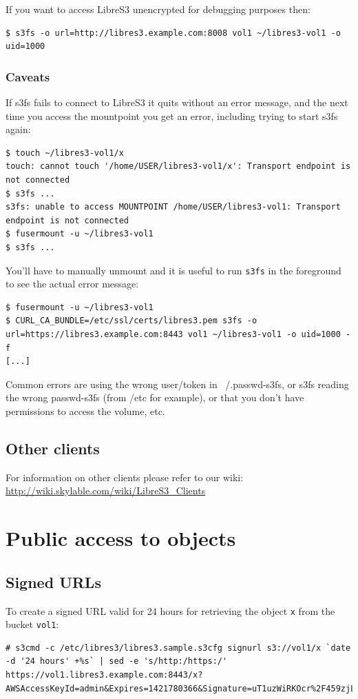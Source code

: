 If you want to access LibreS3 unencrypted for debugging purposes then:
\begin{lstlisting}
$ s3fs -o url=http://libres3.example.com:8008 vol1 ~/libres3-vol1 -o uid=1000
\end{lstlisting}

\subsection*{Caveats}

If s3fs fails to connect to LibreS3 it quits without an error message,
and the next time you access the mountpoint you get an error,
including trying to start s3fs again:
\begin{lstlisting}
$ touch ~/libres3-vol1/x
touch: cannot touch '/home/USER/libres3-vol1/x': Transport endpoint is not connected
$ s3fs ...
s3fs: unable to access MOUNTPOINT /home/USER/libres3-vol1: Transport endpoint is not connected
$ fusermount -u ~/libres3-vol1
$ s3fs ...
\end{lstlisting}

You'll have to manually unmount and it is useful to run \verb|s3fs| in the
foreground to see the actual error message:
\begin{lstlisting}
$ fusermount -u ~/libres3-vol1
$ CURL_CA_BUNDLE=/etc/ssl/certs/libres3.pem s3fs -o url=https://libres3.example.com:8443 vol1 ~/libres3-vol1 -o uid=1000 -f
[...]
\end{lstlisting}

Common errors are using the wrong user/token in ~/.passwd-s3fs, or
s3fs reading the wrong passwd-s3fs (from /etc for example), or that you don't have permissions to access the volume, etc.

\section*{Other clients}
For information on other clients please refer to our wiki:
\url{http://wiki.skylable.com/wiki/LibreS3_Clients}

\chapter*{Public access to objects}
\section*{Signed URLs}

To create a signed URL valid for 24 hours for retrieving the object \verb|x| from the bucket \verb|vol1|:
\begin{lstlisting}
# s3cmd -c /etc/libres3/libres3.sample.s3cfg signurl s3://vol1/x `date -d '24 hours' +%s` | sed -e 's/http:/https:/'
https://vol1.libres3.example.com:8443/x?AWSAccessKeyId=admin&Expires=1421780366&Signature=uT1uzWiRKOcr%2F459zjLvmWoMTSg%3D
\end{lstlisting}

